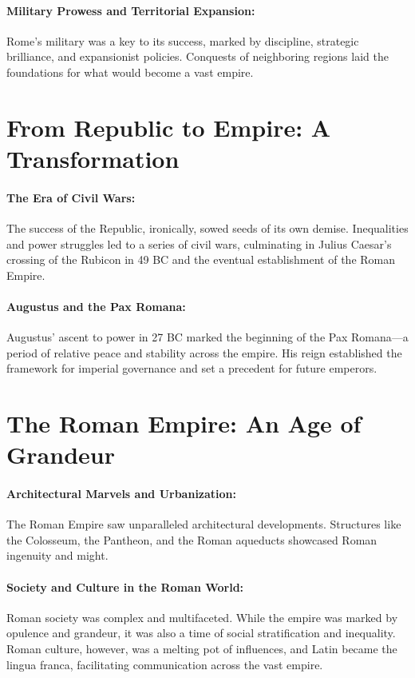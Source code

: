 \documentclass[a4paper,12pt]{book}
\begin{document}
\paragraph{Military Prowess and Territorial Expansion:}
Rome's military was a key to its success, marked by discipline, strategic brilliance, and expansionist policies. Conquests of neighboring regions laid the foundations for what would become a vast empire.

\section*{From Republic to Empire: A Transformation}

\paragraph{The Era of Civil Wars:}
The success of the Republic, ironically, sowed seeds of its own demise. Inequalities and power struggles led to a series of civil wars, culminating in Julius Caesar's crossing of the Rubicon in 49 BC and the eventual establishment of the Roman Empire.

\paragraph{Augustus and the Pax Romana:}
Augustus’ ascent to power in 27 BC marked the beginning of the Pax Romana—a period of relative peace and stability across the empire. His reign established the framework for imperial governance and set a precedent for future emperors.

\section*{The Roman Empire: An Age of Grandeur}

\paragraph{Architectural Marvels and Urbanization:}
The Roman Empire saw unparalleled architectural developments. Structures like the Colosseum, the Pantheon, and the Roman aqueducts showcased Roman ingenuity and might.

\paragraph{Society and Culture in the Roman World:}
Roman society was complex and multifaceted. While the empire was marked by opulence and grandeur, it was also a time of social stratification and inequality. Roman culture, however, was a melting pot of influences, and Latin became the lingua franca, facilitating communication across the vast empire.
\end{document}
